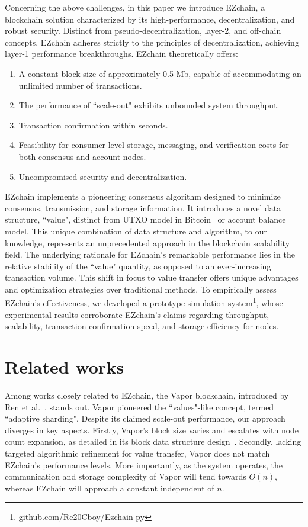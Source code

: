 \documentclass[conference]{IEEEtran}
\begin{document}
Concerning the above challenges, in this paper we introduce EZchain, a blockchain solution characterized by its high-performance, decentralization, and robust security. Distinct from pseudo-decentralization, layer-2, and off-chain concepts, EZchain adheres strictly to the principles of decentralization, achieving layer-1 performance breakthroughs. EZchain theoretically offers:
\begin{enumerate}
\item A constant block size of approximately 0.5 Mb, capable of accommodating an unlimited number of transactions.
\item The performance of ``scale-out" exhibits unbounded system throughput.
\item Transaction confirmation within seconds.
\item Feasibility for consumer-level storage, messaging, and verification costs for both consensus and account nodes.
\item Uncompromised security and decentralization.
\end{enumerate}

EZchain implements a pioneering consensus algorithm designed to minimize consensus, transmission, and storage information. It introduces a novel data structure, ``value", distinct from UTXO model in Bitcoin~\cite{BitcoinWiki2019} or account balance model. This unique combination of data structure and algorithm, to our knowledge, represents an unprecedented approach in the blockchain scalability field. The underlying rationale for EZchain's remarkable performance lies in the relative stability of the ``value" quantity, as opposed to an ever-increasing transaction volume. This shift in focus to value transfer offers unique advantages and optimization strategies over traditional methods. To empirically assess EZchain's effectiveness, we developed a prototype simulation system\footnote{github.com/Re20Cboy/Ezchain-py}, whose experimental results corroborate EZchain's claims regarding throughput, scalability, transaction confirmation speed, and storage efficiency for nodes.


\section{Related works}
\label{sec: Related works}

Among works closely related to EZchain, the Vapor blockchain, introduced by Ren et al.~\cite{VAPOR2018,SpontaneousSharding}, stands out. Vapor pioneered the ``values"-like concept, termed ``adaptive sharding". Despite its claimed scale-out performance, our approach diverges in key aspects. Firstly, Vapor's block size varies and escalates with node count expansion, as detailed in its block data structure design~\cite{SpontaneousSharding}. Secondly, lacking targeted algorithmic refinement for value transfer, Vapor does not match EZchain's performance levels. More importantly, as the system operates, the communication and storage complexity of Vapor will tend towards $O(n)$, whereas EZchain will approach a constant independent of $n$.
\end{document}
